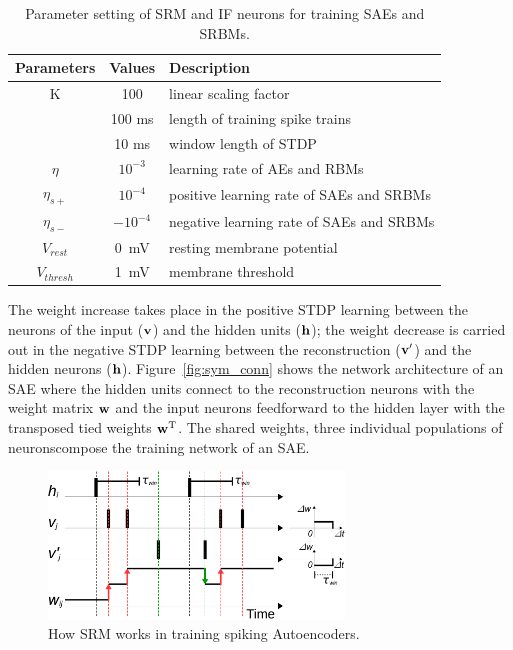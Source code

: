 \begin{table}[th]
	\centering
	\caption{\label{tbl:srm}Parameter setting of SRM and IF neurons for training SAEs and SRBMs.}
	\bgroup
	\def\arraystretch{1.2}
	\begin{tabular}{c c l}
		Parameters & Values & Description \\
		\hline
		K & 100 & linear scaling factor\\
		\DIFdelbeginFL \DIFdelFL{$\tau_{dur}$ }\DIFdelendFL \DIFaddbeginFL \DIFaddFL{$\tau_{\textit{\textrm{dur}}}$ }\DIFaddendFL & 100 ms &  length of training spike trains\\
		\DIFdelbeginFL \DIFdelFL{$\tau_{win}$ }\DIFdelendFL \DIFaddbeginFL \DIFaddFL{$\tau_{\textit{\textrm{win}}}$ }\DIFaddendFL & 10 ms & window length of STDP\\
		$\eta$ & $10^{-3}$ & learning rate of AEs and RBMs\\
		$\eta_{s+}$ & $10^{-4}$ & positive learning rate of SAEs and SRBMs\\
		$\eta_{s-}$ & $-10^{-4}$ & negative learning rate of SAEs and SRBMs\\
		$V_{rest}$ & 0~mV & resting membrane potential\\
		$V_{thresh}$ & 1~mV & membrane threshold  \\
	\end{tabular}
	\egroup
\end{table}


The weight increase takes place in the positive STDP learning between the neurons of the input ($\bf{v}$) and the hidden units ($\bf{h}$); 
the weight decrease is carried out in the negative STDP learning between the reconstruction ($\bf{v'}$) and the hidden neurons ($\bf{h}$).
Figure~\ref{fig:sym_conn} shows the network architecture of an SAE where the hidden units connect to the reconstruction neurons with the weight matrix $\bf{w}$ and the input neurons feedforward to the hidden layer with the transposed tied weights $\bf{w}^\textrm{T}$.
The shared weights, \DIFaddbegin {}\DIFaddend three individual populations of neurons\DIFaddbegin \DIFadd{, }\DIFaddend compose the training network of an SAE.

\begin{figure}[th]
	\centering
	\includegraphics[width=0.7\textwidth]{pics_sdlm/rSTDP.pdf}
	\caption{How SRM works in training spiking Autoencoders.}
	\label{fig:rSTDP}
\end{figure}

